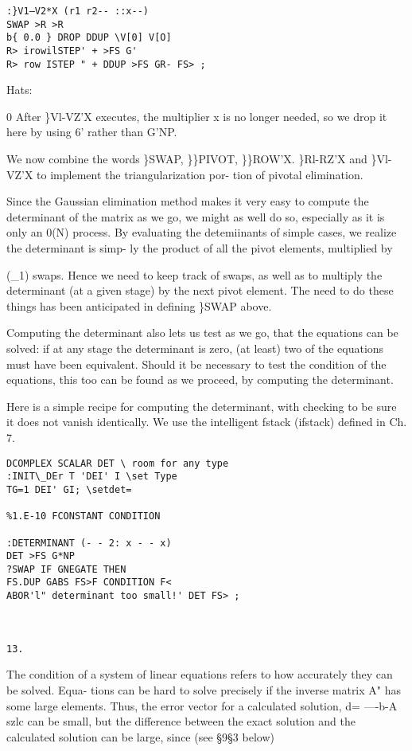 {{{{{{{{{\begin{verbatim}
:}V1—V2*X (r1 r2-- ::x--)
SWAP >R >R
b{ 0.0 } DROP DDUP \V[0] V[O]
R> irowilSTEP' + >FS G'
R> row ISTEP " + DDUP >FS GR- FS> ;

\end{verbatim} 
Hats:

0 After \}Vl-VZ'X executes, the multiplier x is no longer needed,
so we drop it here by using 6' rather than G'NP.

We now combine the words \}SWAP, \}\}PIVOT, \}\}ROW'X.
\}Rl-RZ'X and \}Vl-VZ'X to implement the triangularization por-
tion of pivotal elimination.




Since the Gaussian elimination method makes it very easy to
compute the determinant of the matrix as we go, we might as well
do so, especially as it is only an 0(N) process. By evaluating the
detemiinants of simple cases, we realize the determinant is simp-
ly the product of all the pivot elements, multiplied by

(\_1) swaps. Hence we need to keep track of swaps, as well as to
multiply the determinant (at a given stage) by the next pivot
element. The need to do these things has been anticipated in
defining \}SWAP above.

Computing the determinant also lets us test as we go, that the
equations can be solved: if at any stage the determinant is zero,
(at least) two of the equations must have been equivalent. Should
it be necessary to test the condition of the equations, this too
can be found as we proceed, by computing the determinant.

Here is a simple recipe for computing the determinant, with
checking to be sure it does not vanish identically. We use the
intelligent fstack (ifstack) deﬁned in Ch. 7.

\begin{verbatim}
DCOMPLEX SCALAR DET \ room for any type
:INIT\_DEr T 'DEI' I \set Type
TG=1 DEI' GI; \setdet=

%1.E-10 FCONSTANT CONDITION

:DETERMINANT (- - 2: x - - x)
DET >FS G*NP
?SWAP IF GNEGATE THEN
FS.DUP GABS FS>F CONDITION F<
ABOR'l" determinant too small!' DET FS> ;

 

13.
\end{verbatim} 

The condition of a system of linear equations refers to how accurately they can be solved. Equa-
tions can be hard to solve precisely if the inverse matrix A" has some large elements. Thus, the
error vector for a calculated solution, d= —-b-A szlc can be small, but the difference between the
exact solution and the calculated solution can be large, since (see \S9\S3 below)

}}}}}}}}}

